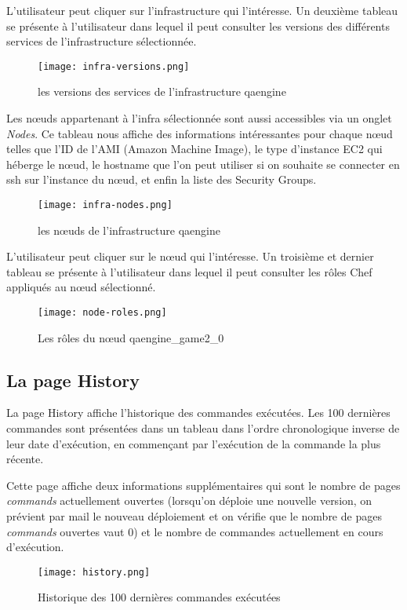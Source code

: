 L'utilisateur peut cliquer sur l'infrastructure qui l'intéresse.
Un deuxième tableau se présente à l'utilisateur dans lequel il peut consulter
les versions des différents services de l'infrastructure sélectionnée.
\begin{figure}[H]
  \texttt{[image: infra-versions.png]}  
  \caption{les versions des services de l'infrastructure qaengine}
\end{figure}

Les nœuds appartenant à l'infra sélectionnée sont aussi accessibles via un
onglet \textit{Nodes}. 
Ce tableau nous affiche des informations intéressantes pour chaque nœud telles
que l'ID de l'AMI (Amazon Machine Image), le type d'instance EC2 qui héberge le
nœud, le hostname que l'on peut utiliser si on souhaite se connecter en ssh sur
l'instance du nœud, et enfin la liste des Security Groups.

\begin{figure}[H]
  \texttt{[image: infra-nodes.png]}  
  \caption{les nœuds de l'infrastructure qaengine}
\end{figure}

L'utilisateur peut cliquer sur le nœud qui l'intéresse.
Un troisième et dernier tableau se présente à l'utilisateur dans lequel il peut
consulter les rôles Chef appliqués au nœud sélectionné.

\begin{figure}[H]
  \texttt{[image: node-roles.png]}  
  \caption{Les rôles du nœud qaengine\_game2\_0}
\end{figure}

\subsection{La page History}

La page History affiche l'historique des commandes exécutées.
Les 100 dernières commandes sont présentées dans un tableau dans l'ordre
chronologique inverse de leur date d'exécution, en commençant par l'exécution de
la commande la plus récente.

Cette page affiche deux informations supplémentaires qui sont le nombre de
pages \textit{commands} actuellement ouvertes (lorsqu'on déploie une nouvelle
version, on prévient par mail le nouveau déploiement et on vérifie que le nombre
de pages \textit{commands} ouvertes vaut 0) et le nombre de commandes
actuellement en cours d'exécution.

\begin{figure}[H]
  \texttt{[image: history.png]}  
  \caption{Historique des 100 dernières commandes exécutées}
\end{figure}


